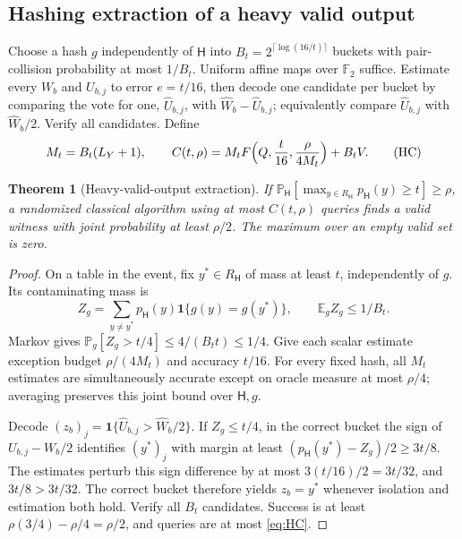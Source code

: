 \documentclass[11pt]{article}
\newtheorem{theorem}{Theorem}[section]
\theoremstyle{definition}\newtheorem{definition}[theorem]{Definition}
\theoremstyle{remark}\newtheorem{remark}[theorem]{Remark}
\newcommand{\E}{\mathbb E}\newcommand{\Prb}{\mathbb P}
\begin{document}
\subsection{Hashing extraction of a heavy valid output}
Choose a hash \(g\) independently of \(\mathsf H\) into \(B_t=2^{\lceil\log(16/t)\rceil}\) buckets with pair-collision probability at most \(1/B_t\). Uniform affine maps over \(\mathbb F_2\) suffice. Estimate every \(W_b\) and \(U_{b,j}\) to error \(e=t/16\), then decode one candidate per bucket by comparing the vote for one, \(\widehat U_{b,j}\), with \(\widehat W_b-\widehat U_{b,j}\); equivalently compare \(\widehat U_{b,j}\) with \(\widehat W_b/2\). Verify all candidates. Define
\[
 M_t=B_t(L_Y+1),\qquad
 C(t,\rho)=M_tF\Bigl(Q,\frac t{16},\frac\rho{4M_t}\Bigr)+B_tV.
 \tag{HC}\label{eq:HC}
\]

\begin{theorem}[Heavy-valid-output extraction]\label{heavy}
If \(\Prb_{\mathsf H}[\max_{y\in R_{\mathsf H}}p_{\mathsf H}(y)\ge t]\ge\rho\), a randomized classical algorithm using at most \(C(t,\rho)\) queries finds a valid witness with joint probability at least \(\rho/2\). The maximum over an empty valid set is zero.
\end{theorem}
\begin{proof}
On a table in the event, fix \(y^*\in R_{\mathsf H}\) of mass at least \(t\), independently of \(g\). Its contaminating mass is
\[
 Z_g=\sum_{y\ne y^*}p_{\mathsf H}(y)\mathbf 1\{g(y)=g(y^*)\},\qquad\E_gZ_g\le1/B_t.
\]
Markov gives \(\Prb_g[Z_g>t/4]\le4/(B_tt)\le1/4\). Give each scalar estimate exception budget \(\rho/(4M_t)\) and accuracy \(t/16\). For every fixed hash, all \(M_t\) estimates are simultaneously accurate except on oracle measure at most \(\rho/4\); averaging preserves this joint bound over \(\mathsf H,g\).

Decode \((z_b)_j=\mathbf 1\{\widehat U_{b,j}>\widehat W_b/2\}\). If \(Z_g\le t/4\), in the correct bucket the sign of \(U_{b,j}-W_b/2\) identifies \((y^*)_j\) with margin at least \((p_{\mathsf H}(y^*)-Z_g)/2\ge3t/8\). The estimates perturb this sign difference by at most \(3(t/16)/2=3t/32\), and \(3t/8>3t/32\). The correct bucket therefore yields \(z_b=y^*\) whenever isolation and estimation both hold. Verify all \(B_t\) candidates. Success is at least \(\rho(3/4)-\rho/4=\rho/2\), and queries are at most \eqref{eq:HC}.
\end{proof}
\end{document}
